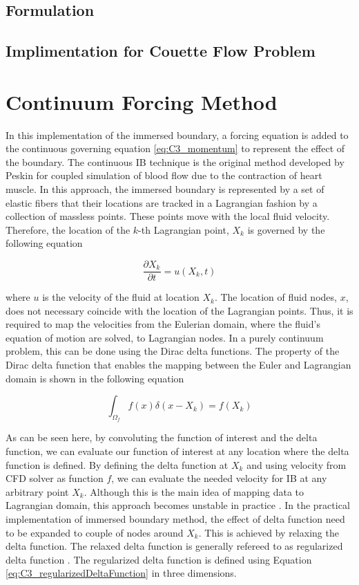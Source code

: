 \subsection{Formulation}
\subsection{Implimentation for Couette Flow Problem}

\section{Continuum Forcing Method}
In this implementation of the immersed boundary, a forcing equation is added to the continuous governing equation \eqref{eq:C3_momentum} to represent the effect of the boundary. The continuous IB technique is the original method developed by Peskin \cite{peskin1972flow} for coupled simulation of blood flow due to the contraction of heart muscle. In this approach, the immersed boundary is represented by a set of elastic fibers that their locations are tracked in a Lagrangian fashion by a collection of massless points. These points move with the local fluid velocity. Therefore, the location of the $k$-th Lagrangian point, $X_k$ is governed by the following equation

\begin{equation}
	\frac{\partial X_k}{\partial t} = u(X_k, t)
\end{equation}

where $u$ is the velocity of the fluid at location $X_k$. The location of fluid nodes, $x$, does not necessary coincide with the location of the Lagrangian points. Thus, it is required to map the velocities from the Eulerian domain, where the fluid's equation of motion are solved, to Lagrangian nodes. In a purely continuum problem, this can be done using the Dirac delta functions. The property of the Dirac delta function that enables the mapping between the Euler and Lagrangian domain is shown in the following equation

\begin{equation}
	\int_{\Omega_f} f(x) \delta(x - X_k) = f(X_k)
\end{equation}

As can be seen here, by convoluting the function of interest and the delta function, we can evaluate our function of interest at any location where the delta function is defined. By defining the delta function at $X_k$ and using velocity from CFD solver as function $f$, we can evaluate the needed velocity for IB at any arbitrary point $X_k$. Although this is the main idea of mapping data to Lagrangian domain, this approach becomes unstable in practice \cite{lee2003stability}. In the practical implementation of immersed boundary method, the effect of delta function need to be expanded to couple of nodes around $X_k$. This is achieved by relaxing the delta function. The relaxed delta function is generally refereed to as regularized delta function \cite{shin2008assessment}. The regularized delta function is defined using Equation \eqref{eq:C3_regularizedDeltaFunction} in three dimensions.

